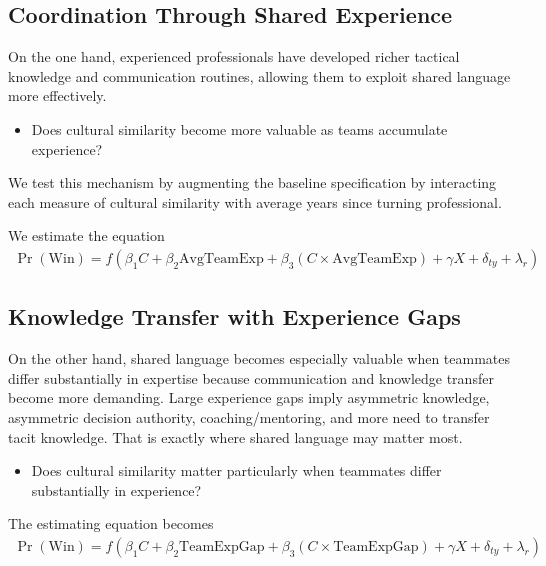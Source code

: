 \documentclass[10pt]{article}
\begin{document}
\subsection{Coordination Through Shared Experience} 


On the one hand, experienced professionals have developed richer tactical knowledge and communication routines, allowing them to exploit shared language more effectively. 

\begin{itemize}

\item Does cultural similarity become more valuable as teams accumulate experience? 
\end{itemize}
We test this mechanism by augmenting the baseline specification by interacting each measure of cultural similarity with average years since turning professional.

We estimate the equation 
\begin{align}
\operatorname{Pr}(\text{Win}) = f(\beta_1 C + \beta_2 \text{AvgTeamExp} + \beta_3 (C \times \text{AvgTeamExp}) + \gamma X + \delta_{ty} + \lambda_r)
\end{align}
\subsection{Knowledge Transfer with Experience Gaps} 

On the other hand, shared language becomes especially valuable when teammates differ substantially in expertise because communication and knowledge transfer become more demanding. Large experience gaps imply asymmetric knowledge, asymmetric decision authority, coaching/mentoring,
 and more need to transfer tacit knowledge. That is exactly where shared language may matter most.
\begin{itemize}
\item Does cultural similarity matter particularly when teammates differ substantially in experience?
\end{itemize}
The estimating equation becomes
\begin{align}
\operatorname{Pr}(\text{Win}) = f(\beta_1 C + \beta_2 \text{TeamExpGap} + \beta_3 (C \times \text{TeamExpGap}) + \gamma X + \delta_{ty} + \lambda_r)
\end{align}
\end{document}

